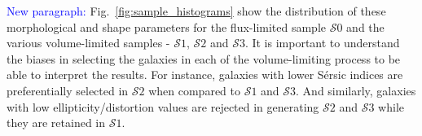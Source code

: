 \documentclass[twocolumn,useAMS,usenatbib]{mn2e}
\newcommand{\arun}[1]{{\textcolor{blue}{#1}}}
\newcommand{\sersic}{S\'{e}rsic }
\newcommand{\s}{\ensuremath{\mathcal{S}}}
\begin{document}
\arun{New paragraph:} Fig.~\ref{fig:sample_histograms} show the distribution of these morphological and shape parameters for the flux-limited sample \s$0$ and the various
volume-limited samples - \s$1$, \s$2$ and \s$3$. It is important to understand the biases in selecting the galaxies in each of the volume-limiting process to be able to interpret the results.
For instance, galaxies with lower \sersic indices are preferentially selected in \s$2$ when compared to \s$1$ and \s$3$. And similarly, galaxies with low ellipticity/distortion values
are rejected in generating \s$2$ and \s$3$ while they are retained in \s$1$.																																																																																																																																																																																																																																																																																																																																																																																																																																																																																																																																																																																																																																																																																																																																																																																																																																																																																																																																																																																																																																																																																																																																																																																																																																																																																																																																																																																																																																																																																																																																																																																																																																																																																																																																																																																																																																																																																																																																																																																																																																																																																																																																																																																																																																																																																																																																																																																																																																																																																																																																																																																																																																																																																																																																																																																																																									
\end{document}
